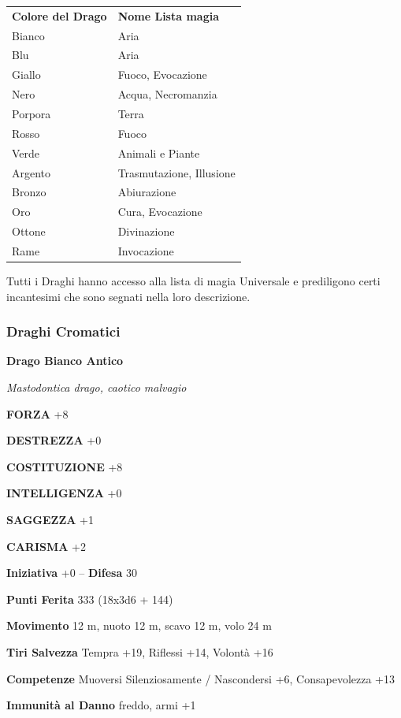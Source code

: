 \begin{multicols}{2}
\begin{tabular}{ll}
\hline
\textbf{Colore del Drago}& \textbf{Nome Lista magia} \\
Bianco& Aria\\
Blu& Aria\\
Giallo& Fuoco, Evocazione\\
Nero&Acqua, Necromanzia\\
Porpora&Terra\\
Rosso&Fuoco\\
Verde&Animali e Piante\\
Argento&Trasmutazione, Illusione\\
Bronzo&Abiurazione\\
Oro&Cura, Evocazione\\
Ottone&Divinazione\\
Rame&Invocazione\\
\end{tabular}

\medskip

Tutti i Draghi hanno accesso alla lista di magia Universale e prediligono certi incantesimi che sono segnati nella loro descrizione.

\subsubsection{Draghi Cromatici}

\medskip{}\textbf{Drago Bianco Antico}

\textit{Mastodontica drago, caotico malvagio}

\textbf{FORZA} +8

\textbf{DESTREZZA} +0

\textbf{COSTITUZIONE} +8

\textbf{INTELLIGENZA} +0

\textbf{SAGGEZZA} +1

\textbf{CARISMA} +2

\textbf{Iniziativa} +0 -- \textbf{Difesa} 30

\textbf{Punti Ferita} 333 (18x3d6 + 144)

\textbf{Movimento} 12 m, nuoto 12 m, scavo 12 m, volo 24 m

\textbf{Tiri Salvezza} Tempra +19, Riflessi +14, Volontà +16

\textbf{Competenze} Muoversi Silenziosamente / Nascondersi +6, Consapevolezza +13

\textbf{Immunità al Danno} freddo, armi +1


\end{multicols}
